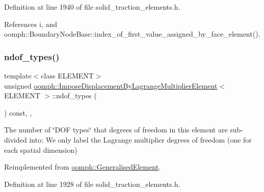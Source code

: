 Definition at line 1940 of file solid\+\_\+traction\+\_\+elements.\+h.



References i, and oomph\+::\+Boundary\+Node\+Base\+::index\+\_\+of\+\_\+first\+\_\+value\+\_\+assigned\+\_\+by\+\_\+face\+\_\+element().

\mbox{\label{classoomph_1_1ImposeDisplacementByLagrangeMultiplierElement_a321d06e523a87b42c25ac14a11229ee7}} 
\subsubsection{\texorpdfstring{ndof\+\_\+types()}{ndof\_types()}}
{\footnotesize\ttfamily template$<$class E\+L\+E\+M\+E\+NT$>$ \\
unsigned \hyperlink{classoomph_1_1ImposeDisplacementByLagrangeMultiplierElement}{oomph\+::\+Impose\+Displacement\+By\+Lagrange\+Multiplier\+Element}$<$ E\+L\+E\+M\+E\+NT $>$\+::ndof\+\_\+types (\begin{DoxyParamCaption}{ }\end{DoxyParamCaption}) const\hspace{0.3cm}{\ttfamily [inline]}, {\ttfamily [protected]}, {\ttfamily [virtual]}}



The number of \char`\"{}\+D\+O\+F types\char`\"{} that degrees of freedom in this element are sub-\/divided into\+: We only label the Lagrange multiplier degrees of freedom (one for each spatial dimension) 



Reimplemented from \hyperlink{classoomph_1_1GeneralisedElement_a0c6037a870597b35dcf1c780710b9a56}{oomph\+::\+Generalised\+Element}.



Definition at line 1928 of file solid\+\_\+traction\+\_\+elements.\+h.

\mbox{\label{classoomph_1_1ImposeDisplacementByLagrangeMultiplierElement_aabe7cb82a9040aec297ad37f55550e3d}} 
